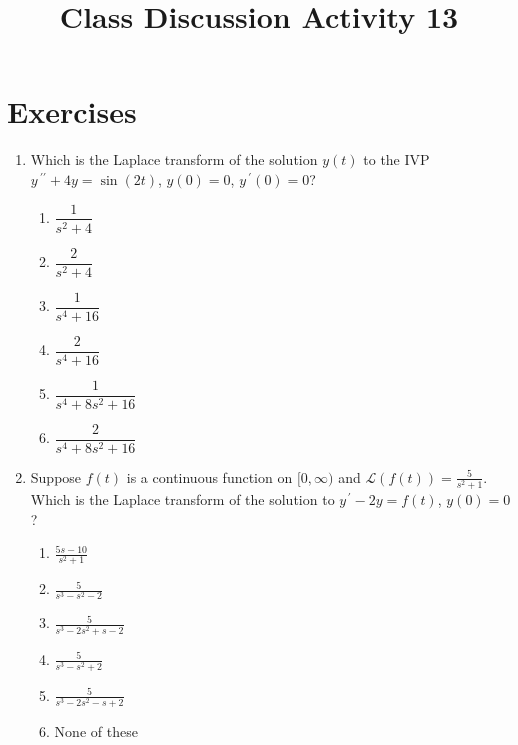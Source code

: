\documentclass{ximera}
\begin{document}
\begin{abstract}
 \end{abstract}

    \title{Class Discussion Activity 13}
    
    \maketitle

\section*{Exercises}



\begin{enumerate}[label=(\arabic*)]


\item Which is the Laplace transform of the solution $y(t)$ to the IVP \\$y\,^{\prime\prime}+4y=\sin{(2t)}$, $y(0)=0$, $y\,^{\prime}(0)=0$?





\begin{enumerate}[label=(\alph*)]
\item $\dfrac{1}{s^2+4}$
\item $\dfrac{2}{s^2+4}$
\item $\dfrac{1}{s^4+16}$
\item $\dfrac{2}{s^4+16}$
\item $\dfrac{1}{s^4+8s^2+16}$
\item $\dfrac{2}{s^4+8s^2+16}$  %
\end{enumerate}



\item Suppose $f(t)$ is a continuous function on $[0,\infty)$ and $\mathcal{L}(f(t))=\frac{5}{s^2+1}$.  Which is the Laplace transform of the solution to $y^{\,\prime}-2y=f(t)$, $y(0)=0$?


\begin{enumerate}[label=(\alph*)]
\item $\frac{5s-10}{s^2+1}$
\item $\frac{5}{s^3-s^2-2}$
\item $\frac{5}{s^3-2s^2+s-2}$  %
\item $\frac{5}{s^3-s^2+2}$
\item $\frac{5}{s^3-2s^2-s+2}$
\item None of these
\end{enumerate}


\end{enumerate}
\end{document}
